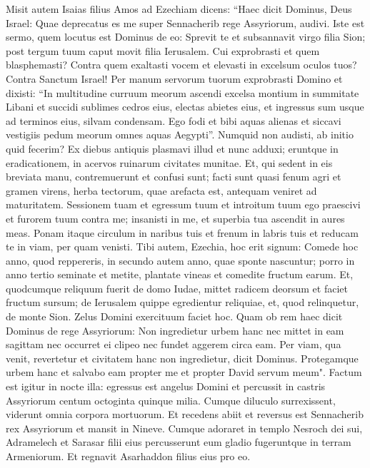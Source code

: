 \begin{biblechapter}
\verse Misit autem Isaias filius Amos ad Ezechiam dicens: “Haec dicit Dominus, Deus Israel: Quae deprecatus es me super Sennacherib rege Assyriorum, audivi. 
\verse Iste est sermo, quem locutus est Dominus de eo: Sprevit te et subsannavit virgo filia Sion; post tergum tuum caput movit filia Ierusalem. 
\verse Cui exprobrasti et quem blasphemasti? Contra quem exaltasti vocem et elevasti in excelsum oculos tuos? Contra Sanctum Israel! 
\verse Per manum servorum tuorum exprobrasti Domino et dixisti: “In multitudine curruum meorum ascendi excelsa montium in summitate Libani et succidi sublimes cedros eius, electas abietes eius, et ingressus sum usque ad terminos eius, silvam condensam. 
\verse Ego fodi et bibi aquas alienas et siccavi vestigiis pedum meorum omnes aquas Aegypti”. 
\verse Numquid non audisti, ab initio quid fecerim? Ex diebus antiquis plasmavi illud et nunc adduxi; eruntque in eradicationem, in acervos ruinarum civitates munitae. 
\verse Et, qui sedent in eis breviata manu, contremuerunt et confusi sunt; facti sunt quasi fenum agri et gramen virens, herba tectorum, quae arefacta est, antequam veniret ad maturitatem. 
\verse Sessionem tuam et egressum tuum et introitum tuum ego praescivi et furorem tuum contra me; 
\verse insanisti in me, et superbia tua ascendit in aures meas. Ponam itaque circulum in naribus tuis et frenum in labris tuis et reducam te in viam, per quam venisti. 
\verse Tibi autem, Ezechia, hoc erit signum: Comede hoc anno, quod reppereris, in secundo autem anno, quae sponte nascuntur; porro in anno tertio seminate et metite, plantate vineas et comedite fructum earum. 
\verse Et, quodcumque reliquum fuerit de domo Iudae, mittet radicem deorsum et faciet fructum sursum; 
\verse de Ierusalem quippe egredientur reliquiae, et, quod relinquetur, de monte Sion. Zelus Domini exercituum faciet hoc. 
\verse Quam ob rem haec dicit Dominus de rege Assyriorum: Non ingredietur urbem hanc nec mittet in eam sagittam nec occurret ei clipeo nec fundet aggerem circa eam. 
\verse Per viam, qua venit, revertetur et civitatem hanc non ingredietur, dicit Dominus. 
\verse Protegamque urbem hanc et salvabo eam propter me et propter David servum meum". 
\verse Factum est igitur in nocte illa: egressus est angelus Domini et percussit in castris Assyriorum centum octoginta quinque milia. Cumque diluculo surrexissent, viderunt omnia corpora mortuorum. 
\verse Et recedens abiit et reversus est Sennacherib rex Assyriorum et mansit in Nineve. 
\verse Cumque adoraret in templo Nesroch dei sui, Adramelech et Sarasar filii eius percusserunt eum gladio fugeruntque in terram Armeniorum. Et regnavit Asarhaddon filius eius pro eo. 
\end{biblechapter}

